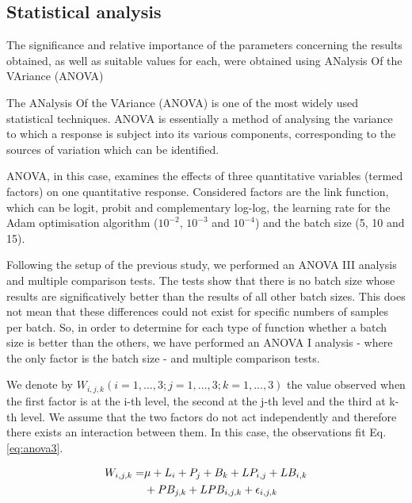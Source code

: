 \documentclass[10pt, a4paper, titlepage]{article}
\begin{document}
\begin{multicols}{2}
	\subsection{Statistical analysis}
	The significance and relative importance of the parameters concerning the results obtained, as well as suitable values for each, were obtained using ANalysis Of the VAriance (ANOVA)
	
	The ANalysis Of the VAriance (ANOVA) \cite{miller1997beyond} is one of the most widely used statistical techniques. ANOVA is essentially a method of analysing the variance to which a response is subject into its various components, corresponding to the sources of variation which can be identified.
	
	ANOVA, in this case, examines the effects of three quantitative variables (termed factors) on one quantitative response. Considered factors are the link function, which can be logit, probit and complementary log-log, the learning rate for the Adam optimisation algorithm ($10^{-2}$, $10^{-3}$ and $10^{-4}$) and the batch size (5, 10 and 15).
	
	Following the setup of the previous study, we performed an ANOVA III analysis and multiple comparison tests. The tests show that there is no batch size whose results are significatively better than the results of all other batch sizes. This does not mean that these differences could not exist for specific numbers of samples per batch. So, in order to determine for each type of function whether a batch size is better than the others, we have performed an ANOVA I analysis - where the only factor is the batch size - and multiple comparison tests.
	
	We denote by $W_{i,j,k}(i=1, ..., 3; j = 1, ..., 3; k = 1, ..., 3)$ the value observed when the first factor is at the i-th level, the second at the j-th level and the third at k-th level. We assume that the two factors do not act independently and therefore there exists an interaction between them. In this case, the observations fit Eq. \ref{eq:anova3}.
	
	\begin{equation}
	\begin{aligned}
	\footnotesize
	W_{i,j,k} = & \mu + L_i + P_j + B_k + LP_{i,j} + LB_{i,k} \\& + PB_{j,k} + LPB_{i,j,k} + \epsilon_{i,j,k}
	\label{eq:anova3}
	\end{aligned}
	\end{equation}
	

\end{multicols}
\end{document}
